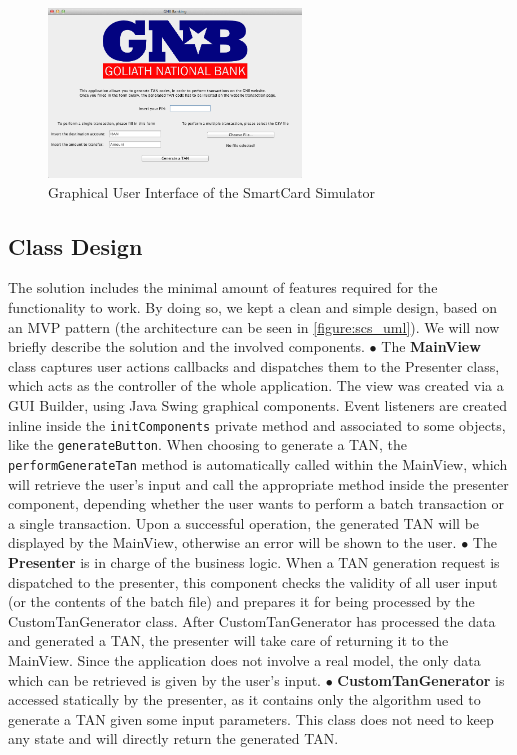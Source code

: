 \begin{figure}[h!tbp]
	\centering
	\includegraphics[width=0.6\textwidth]{figures/scs_gui.png}
	\caption{Graphical User Interface of the SmartCard Simulator}
	\label{figure:scs_gui}
\end{figure}

\subsection{Class Design}
The solution includes the minimal amount of features required for the functionality to work. By doing so, we kept a clean and simple design, based on an MVP pattern (the architecture can be seen in \autoref{figure:scs_uml}). We will now briefly describe the solution and the involved components.\newline
$\bullet$ The \textbf{MainView} class captures user actions callbacks and dispatches them to the Presenter class, which acts as the controller of the whole application. The view was created via a GUI Builder, using Java Swing graphical components.\newline
Event listeners are created inline inside the \texttt{initComponents} private method and associated to some objects, like the \texttt{generateButton}. When choosing to generate a TAN, the \texttt{performGenerateTan} method is automatically called within the MainView, which will retrieve the user's input and call the appropriate method inside the presenter component, depending whether the user wants to perform a batch transaction or a single transaction.\newline
Upon a successful operation, the generated TAN will be displayed by the MainView, otherwise an error will be shown to the user.\newline
$\bullet$ The \textbf{Presenter} is in charge of the business logic. When a TAN generation request is dispatched to the presenter, this component checks the validity of all user input (or the contents of the batch file) and prepares it for being processed by the CustomTanGenerator class. After CustomTanGenerator has processed the data and generated a TAN, the presenter will take care of returning it to the MainView.
Since the application does not involve a real model, the only data which can be retrieved is given by the user's input.\newline
$\bullet$ \textbf{CustomTanGenerator} is accessed statically by the presenter, as it contains only the algorithm used to generate a TAN given some input parameters. This class does not need to keep any state and will directly return the generated TAN.

